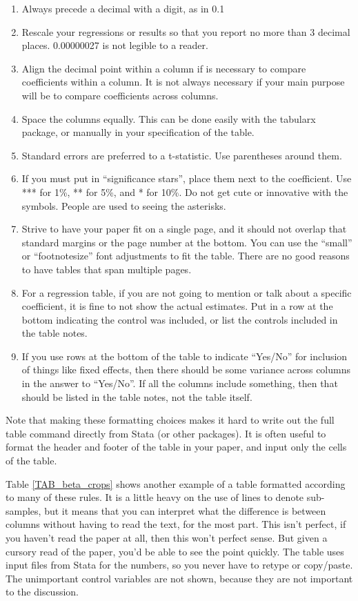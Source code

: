 \documentclass[11pt]{article}
\begin{document}
\begin{enumerate}
    \item Always precede a decimal with a digit, as in 0.1
    \item Rescale your regressions or results so that you report no more than 3 decimal places. 0.00000027 is not legible to a reader.
    \item Align the decimal point within a column if is necessary to compare coefficients within a column. It is not always necessary if your main purpose will be to compare coefficients across columns.
    \item Space the columns equally. This can be done easily with the tabularx package, or manually in your specification of the table.
    \item Standard errors are preferred to a t-statistic. Use parentheses around them.
    \item If you must put in ``significance stars'', place them next to the coefficient. Use *** for 1\%, ** for 5\%, and * for 10\%. Do not get cute or innovative with the symbols. People are used to seeing the asterisks.
    \item Strive to have your paper fit on a single page, and it should not overlap that standard margins or the page number at the bottom. You can use the ``small'' or ``footnotesize'' font adjustments to fit the table. There are no good reasons to have tables that span multiple pages.
    \item For a regression table, if you are not going to mention or talk about a specific coefficient, it is fine to not show the actual estimates. Put in a row at the bottom indicating the control was included, or list the controls included in the table notes.
    \item If you use rows at the bottom of the table to indicate ``Yes/No'' for inclusion of things like fixed effects, then there should be some variance across columns in the answer to ``Yes/No''. If all the columns include something, then that should be listed in the table notes, not the table itself. 
\end{enumerate}

Note that making these formatting choices makes it hard to write out the full table command directly from Stata (or other packages). It is often useful to format the header and footer of the table in your paper, and input only the cells of the table. 

Table \ref{TAB_beta_crops} shows another example of a table formatted according to many of these rules. It is a little heavy on the use of lines to denote sub-samples, but it means that you can interpret what the difference is between columns without having to read the text, for the most part. This isn't perfect, if you haven't read the paper at all, then this won't perfect sense. But given a cursory read of the paper, you'd be able to see the point quickly. The table uses input files from Stata for the numbers, so you never have to retype or copy/paste. The unimportant control variables are not shown, because they are not important to the discussion.
\end{document}

